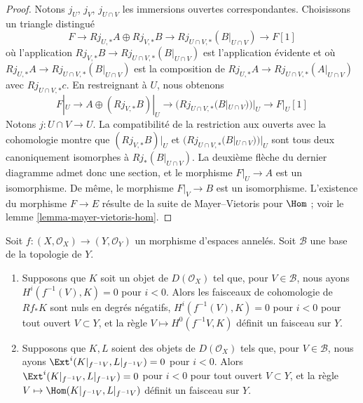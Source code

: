 \begin{proof}

Notons $j_U$, $j_V$, $j_{U \cap V}$ les immersions ouvertes correspondantes. Choisissons un triangle distingué
$$
F \to Rj_{U, *}A \oplus Rj_{V, *}B \to Rj_{U \cap V, *}(B|_{U \cap V})
\to F[1]
$$
où l'application $Rj_{V, *}B \to Rj_{U \cap V, *}(B|_{U \cap V})$ est l'application évidente et où
$Rj_{U, *}A \to Rj_{U \cap V, *}(B|_{U \cap V})$
est la composition de
$Rj_{U, *}A \to Rj_{U \cap V, *}(A|_{U \cap V})$
avec $Rj_{U \cap V, *}c$. En restreignant à $U$, nous obtenons
$$
F|_U \to A \oplus (Rj_{V, *}B)|_U \to (Rj_{U \cap V, *}(B|_{U \cap V}))|_U
\to F|_U[1]
$$
Notons $j : U \cap V \to U$. La compatibilité de la restriction aux ouverts avec la cohomologie montre que
$(Rj_{V, *}B)|_U$ et $(Rj_{U \cap V, *}(B|_{U \cap V}))|_U$
sont tous deux canoniquement isomorphes à $Rj_*(B|_{U \cap V})$. La deuxième flèche du dernier diagramme admet donc une section, et le morphisme $F|_U \to A$ est un isomorphisme. De même, le morphisme $F|_V \to B$ est un isomorphisme. L'existence du morphisme $F \to E$ résulte de la suite de Mayer--Vietoris pour $\Hom$ ; voir le lemme \ref{lemma-mayer-vietoris-hom}.

\end{proof}

\begin{lemma}

\label{lemma-vanishing-and-glueing}

Soit $f : (X, \mathcal{O}_X) \to (Y, \mathcal{O}_Y)$ un morphisme d'espaces annelés. Soit $\mathcal{B}$ une base de la topologie de $Y$.

\begin{enumerate}

\item Supposons que $K$ soit un objet de $D(\mathcal{O}_X)$ tel que, pour $V \in \mathcal{B}$, nous ayons $H^i(f^{-1}(V), K) = 0$ pour $i < 0$. Alors les faisceaux de cohomologie de $Rf_*K$ sont nuls en degrés négatifs,
$H^i(f^{-1}(V), K) = 0$ pour $i < 0$ pour tout ouvert $V \subset Y$, et la règle $V \mapsto H^0(f^{-1}V, K)$ définit un faisceau sur $Y$.
\item Supposons que $K, L$ soient des objets de $D(\mathcal{O}_X)$ tels que, pour $V \in \mathcal{B}$, nous ayons
$\Ext^i(K|_{f^{-1}V}, L|_{f^{-1}V}) = 0$ pour $i < 0$. Alors $\Ext^i(K|_{f^{-1}V}, L|_{f^{-1}V}) = 0$ pour $i < 0$
pour tout ouvert $V \subset Y$, et la règle $V \mapsto \Hom(K|_{f^{-1}V}, L|_{f^{-1}V})$ définit un faisceau sur $Y$.

\end{enumerate}

\end{lemma}

